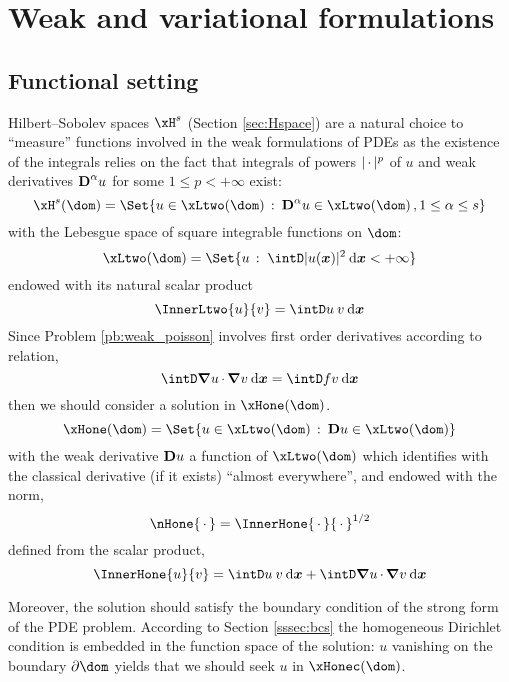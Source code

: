 \section{Weak and variational formulations}\label{sec:weak_forms}

\subsection{Functional setting}

Hilbert--Sobolev spaces $\xH^s$ (Section \ref{sec:Hspace}) are a natural choice to ``measure'' functions involved in the weak formulations of PDEs as the existence of the integrals relies on the fact that integrals of powers $|\,{\mathbf\cdot}\,|^p$ of $u$ and weak derivatives ${\boldsymbol{\mathrm D}}^\alpha u$ for some $1 \leq p < +\infty$ exist:
\begin{equation*}
\xH^s(\dom) = \Set{ u \in \xLtwo(\dom)\,:\: \D^\alpha u \in \xLtwo(\dom)\,, 1 \leq \alpha \leq s }
\end{equation*}
with the Lebesgue space of square integrable functions on $\dom$:
\begin{equation*}
\xLtwo(\dom) = \Set{ u\,:\; \intD |u(\xx)|^2 \dxx < +\infty  }
\end{equation*}
endowed with its natural scalar product
\begin{equation*}
\InnerLtwo{u}{v} = \intD u\: v\dxx
\end{equation*}
Since Problem \eqref{pb:weak_poisson} involves first order derivatives according to relation,
\begin{equation*}
\intD \Grad u\xDot \Grad v\dxx = \intD f v  \dxx
\end{equation*}
then we should consider a solution in $\xHone(\dom)$.
\begin{equation*}
\xHone(\dom) = \Set{ u \in \xLtwo(\dom)\,:\: \D u \in \xLtwo(\dom) }
\end{equation*}
with the weak derivative ${\boldsymbol{\mathrm D}} u$ \ie a function of $\xLtwo(\dom)$ which identifies with the classical derivative (if it exists) ``almost everywhere'', and endowed with the norm,
\begin{equation*}
\nHone{\xDot} = \InnerHone{\xDot}{\xDot}^{1/2}
\end{equation*}
defined from the scalar product,
\begin{equation*}
\InnerHone{u}{v} = \intD u\: v\dxx + \intD \Grad u\xDot \Grad v\dxx
\end{equation*}

\medskip
Moreover, the solution should satisfy the boundary condition of the strong form of the PDE problem. According to Section \ref{sssec:bcs} the homogeneous Dirichlet condition is embedded in the function space of the solution: $u$ vanishing on the boundary $\partial \dom$ yields that we should seek $u$ in $\xHonec(\dom)$.

